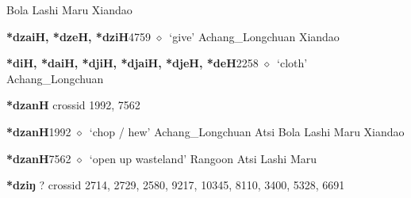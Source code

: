 \begin{list}{}{\leftmargin=1.5em \itemindent=-1.5em}
         Bola 
\hspace{1ex}
         Lashi 
\hspace{1ex}
         Maru 
\hspace{1ex}
         Xiandao 
  \item {\footnotesize \textbf{*dzaiH, *dzeH, *dziH}}{\tiny 4759}
\hspace{1ex}
         $\diamond$~`give'
         Achang\_Longchuan 
\hspace{1ex}
         Xiandao 
  \item {\footnotesize \textbf{*diH, *daiH, *djiH, *djaiH, *djeH, *deH}}{\tiny 2258}
\hspace{1ex}
         $\diamond$~`cloth'
         Achang\_Longchuan 
  \end{list}
\item
\textbf{*dzanH}
  {\tiny crossid 1992, 7562}
  \begin{list}{}{\leftmargin=1.5em \itemindent=-1.5em}
  \item {\footnotesize \textbf{*dzanH}}{\tiny 1992}
         $\diamond$~`chop / hew'
         Achang\_Longchuan 
\hspace{1ex}
         Atsi 
\hspace{1ex}
         Bola 
\hspace{1ex}
         Lashi 
\hspace{1ex}
         Maru 
\hspace{1ex}
         Xiandao 
  \item {\footnotesize \textbf{*dzanH}}{\tiny 7562}
\hspace{1ex}
         $\diamond$~`open up wasteland'
         Rangoon 
\hspace{1ex}
         Atsi 
\hspace{1ex}
         Lashi 
\hspace{1ex}
         Maru 
  \end{list}
\item
\textbf{*dziŋ}
?
  {\tiny crossid 2714, 2729, 2580, 9217, 10345, 8110, 3400, 5328, 6691}

